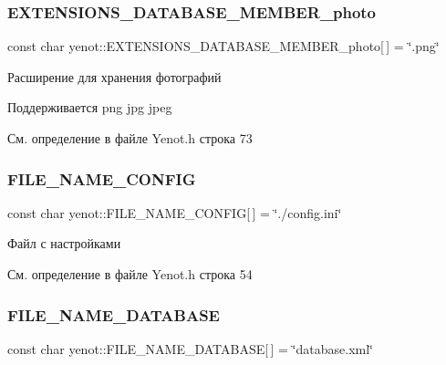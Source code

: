 \subsubsection{\texorpdfstring{E\+X\+T\+E\+N\+S\+I\+O\+N\+S\+\_\+\+D\+A\+T\+A\+B\+A\+S\+E\+\_\+\+M\+E\+M\+B\+E\+R\+\_\+photo}{EXTENSIONS\_DATABASE\_MEMBER\_photo}}
{\footnotesize\ttfamily const char yenot\+::\+E\+X\+T\+E\+N\+S\+I\+O\+N\+S\+\_\+\+D\+A\+T\+A\+B\+A\+S\+E\+\_\+\+M\+E\+M\+B\+E\+R\+\_\+photo\mbox{[}$\,$\mbox{]} = \char`\"{}.png\char`\"{}}

Расширение для хранения фотографий

Поддерживается png jpg jpeg 

См. определение в файле Yenot.\+h строка 73

\mbox{\label{namespaceyenot_a376e7adfbabcae01c8305ed17d47d576}} 
\subsubsection{\texorpdfstring{F\+I\+L\+E\+\_\+\+N\+A\+M\+E\+\_\+\+C\+O\+N\+F\+IG}{FILE\_NAME\_CONFIG}}
{\footnotesize\ttfamily const char yenot\+::\+F\+I\+L\+E\+\_\+\+N\+A\+M\+E\+\_\+\+C\+O\+N\+F\+IG\mbox{[}$\,$\mbox{]} = \char`\"{}./config.\+ini\char`\"{}}



Файл с настройками 



См. определение в файле Yenot.\+h строка 54

\mbox{\label{namespaceyenot_ae254e34a07790b92c8085e559be10f38}} 
\subsubsection{\texorpdfstring{F\+I\+L\+E\+\_\+\+N\+A\+M\+E\+\_\+\+D\+A\+T\+A\+B\+A\+SE}{FILE\_NAME\_DATABASE}}
{\footnotesize\ttfamily const char yenot\+::\+F\+I\+L\+E\+\_\+\+N\+A\+M\+E\+\_\+\+D\+A\+T\+A\+B\+A\+SE\mbox{[}$\,$\mbox{]} = \char`\"{}database.\+xml\char`\"{}}



